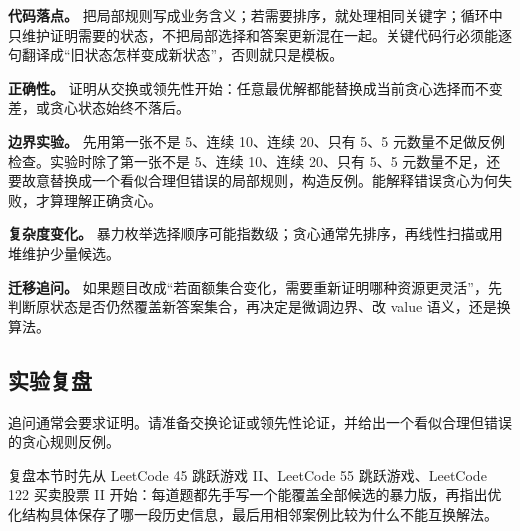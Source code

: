 \textbf{代码落点。} 把局部规则写成业务含义；若需要排序，就处理相同关键字；循环中只维护证明需要的状态，不把局部选择和答案更新混在一起。关键代码行必须能逐句翻译成“旧状态怎样变成新状态”，否则就只是模板。

\textbf{正确性。} 证明从交换或领先性开始：任意最优解都能替换成当前贪心选择而不变差，或贪心状态始终不落后。

\textbf{边界实验。} 先用第一张不是 5、连续 10、连续 20、只有 5、5 元数量不足做反例检查。实验时除了第一张不是 5、连续 10、连续 20、只有 5、5 元数量不足，还要故意替换成一个看似合理但错误的局部规则，构造反例。能解释错误贪心为何失败，才算理解正确贪心。

\textbf{复杂度变化。} 暴力枚举选择顺序可能指数级；贪心通常先排序，再线性扫描或用堆维护少量候选。

\textbf{迁移追问。} 如果题目改成“若面额集合变化，需要重新证明哪种资源更灵活”，先判断原状态是否仍然覆盖新答案集合，再决定是微调边界、改 value 语义，还是换算法。

\subsection{实验复盘}

追问通常会要求证明。请准备交换论证或领先性论证，并给出一个看似合理但错误的贪心规则反例。

复盘本节时先从 LeetCode 45 跳跃游戏 II、LeetCode 55 跳跃游戏、LeetCode 122 买卖股票 II 开始：每道题都先手写一个能覆盖全部候选的暴力版，再指出优化结构具体保存了哪一段历史信息，最后用相邻案例比较为什么不能互换解法。
